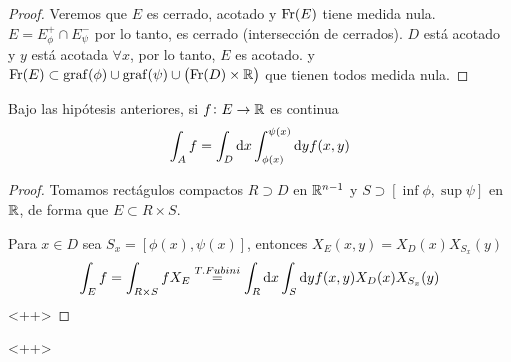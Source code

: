 \begin{proof}
    Veremos que $E$ es cerrado, acotado y $\operatorname{Fr}(E)$ tiene medida nula. $E = E^+_\phi
    \cap E^-_\psi$ por lo tanto, es cerrado (intersección de cerrados). $D$ está
    acotado y $y$ está acotada $\forall x$, por lo tanto, $E$ es acotado. y $\operatorname{Fr}(E)
    \subset \operatorname{graf}(\phi) \cup \operatorname{graf}(\psi) \cup \left( \operatorname{Fr}(D) \times \mathbb{R} \right)$ que
    tienen todos medida nula.
\end{proof}

\begin{prop}
    Bajo las hipótesis anteriores, si $f \colon E \to \mathbb{R}$ es continua
    \[
        \int_A f = \int_D \dif x \int^{\psi(x)}_{\phi(x)} \dif y f(x, y)
    \]
\end{prop}
\begin{proof}
    Tomamos rectágulos compactos $R \supset D$ en $\mathbb{R}^{n-1}$ y $S \supset [\inf\phi,
    \sup\psi]$ en $\mathbb{R}$, de forma que $E \subset R \times S$.

    Para $x \in D$ sea $S_x = [\phi(x), \psi(x)]$, entonces $X_E(x, y) =
    X_D(x)X_{S_x}(y)$
    \[
        \int_E f = \int_{R \times S} f X_E \stackrel{T. Fubini}{=}
        \int_R \dif x \int_S \dif y f(x, y) X_D(x) X_{S_x}(y)
    \]<++>
\end{proof}<++>
